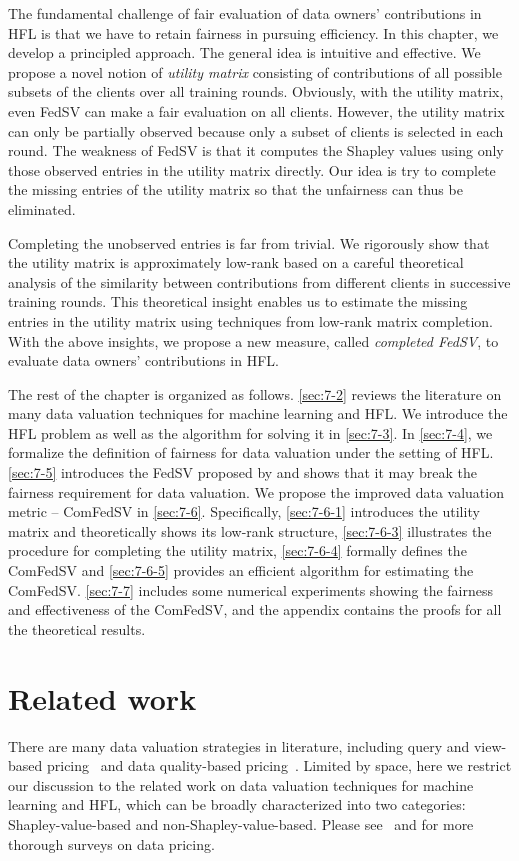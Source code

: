 The fundamental challenge of fair evaluation of data owners' contributions in HFL is that we have to retain fairness in pursuing efficiency. In this chapter, we develop a principled approach. The general idea is intuitive and effective.  We propose a novel notion of \emph{utility matrix} consisting of contributions of all possible subsets of the clients over all training rounds. Obviously, with the utility matrix, even FedSV can make a fair evaluation on all clients.  However, the utility matrix can only be partially observed because only a subset of clients is selected in each round. The weakness of FedSV is that it computes the Shapley values using only those observed entries in the utility matrix directly. Our idea is try to complete the missing entries of the utility matrix so that the unfairness can thus be eliminated. 

Completing the unobserved entries is far from trivial. We rigorously show that the utility matrix is approximately low-rank based on a careful theoretical analysis of the similarity between contributions from different clients in successive training rounds. This theoretical insight enables us to estimate the missing entries in the utility matrix using techniques from low-rank matrix completion.  With the above insights, we propose a new measure, called \emph{completed FedSV}, to evaluate data owners' contributions in HFL. 

The rest of the chapter is organized as follows. \autoref{sec:7-2} reviews the literature on many data valuation techniques for machine learning and HFL. We introduce the HFL problem as well as the algorithm for solving it in \autoref{sec:7-3}. In \autoref{sec:7-4}, we formalize the definition of fairness for data valuation under the setting of HFL. \autoref{sec:7-5} introduces the FedSV proposed by \citet{wang2020principled} and shows that it may break the fairness requirement for data valuation. We propose the improved data valuation metric -- ComFedSV in \autoref{sec:7-6}. Specifically, \autoref{sec:7-6-1} introduces the utility matrix and theoretically shows its low-rank structure, \autoref{sec:7-6-3} illustrates the procedure for completing the utility matrix, \autoref{sec:7-6-4} formally defines the ComFedSV and \autoref{sec:7-6-5} provides an efficient algorithm for estimating the ComFedSV. \autoref{sec:7-7} includes some numerical experiments showing the fairness and effectiveness of the ComFedSV, and the appendix contains the proofs for all the theoretical results. 

\section{Related work} \label{sec:7-2}
There are many data valuation strategies in literature, including query and view-based pricing~\citep{koutris2015query, koutris2012querymarket, koutris2013toward} and data quality-based pricing~\citep{heckman2015pricing, pipino2002data}. Limited by space, here we restrict our discussion to the related work on data valuation techniques for machine learning and HFL, which can be broadly characterized into two categories: Shapley-value-based and non-Shapley-value-based. Please see~\citep{pei2020survey} and \citep{cong2021data} for more thorough surveys on data pricing. 

